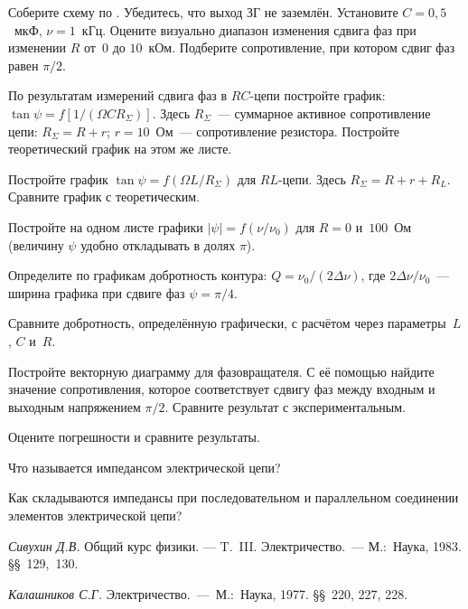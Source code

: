 \begin{lab:task}
	\item Соберите схему по . Убедитесь, что выход ЗГ не
заземлён. Установите $C=0,5$~мкФ, $\nu=1$~кГц. Оцените визуально
	диапазон изменения сдвига фаз при изменении $R$ от~$0$ до $10$~кОм.
Подберите сопротивление, при котором сдвиг фаз равен $\pi/2$.


	\item По результатам измерений сдвига фаз в $RC$-цепи постройте график:
$\tan\psi=f[1/(\Omega C R_{\Sigma})]$. Здесь
	$R_{\Sigma}$~--- суммарное активное сопротивление цепи: $R_{\Sigma}=R+r$;
$r=10$~Ом~--- сопротивление резистора.
	Постройте теоретический график на этом же листе.

	\item Постройте график $\tan\psi=f(\Omega L/R_{\Sigma})$ для $RL$-цепи.
Здесь $R_{\Sigma}=R+r+R_L$. Сравните график с
	теоретическим.

	\item Постройте на одном листе графики $|\psi|=f(\nu/\nu_0)$ для $R=0$
и~$100$~Ом (величину $\psi$ удобно откладывать в
	долях $\pi$).

	Определите по графикам добротность контура: $Q=\nu_0/(2\Delta\nu)$, где
$2\Delta\nu/\nu_0$~--- ширина графика при сдвиге
	фаз $\psi=\pi/4$.

	\item Сравните добротность, определённую графически, с расчётом через
параметры~$L$, $C$ и~$R$.

	\item Постройте векторную диаграмму для фазовращателя. С её помощью найдите
значение сопротивления, которое соответствует сдвигу фаз между входным и
выходным напряжением $\pi/2$. Сравните результат с экспериментальным.

	\item Оцените погрешности и сравните результаты.

\end{lab:task}


\begin{lab:questions}
	\item Что называется импедансом электрической цепи?
	\item Как складываются импедансы при последовательном и параллельном
соединении элементов электрической цепи?
\end{lab:questions}


\begin{lab:literature}
	\item \textit{Сивухин Д.В.} Общий курс физики. --- T.~III. Электричество.~---
М.:~Наука, 1983. \S\S~129,~130.
	\item \textit{Калашников С.Г.} Электричество.~---~М.:~Наука, 1977. \S\S~220,
227, 228.
\end{lab:literature}
